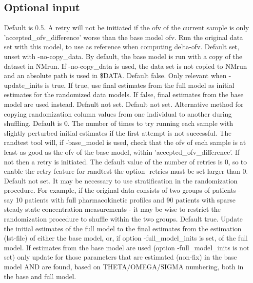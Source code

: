 \subsection{Optional input}
\begin{optionlist}
Default is 0.5. A retry will not be initiated if the ofv of the current sample is only 'accepted\_ofv\_difference' worse 
than the base model ofv.
\nextopt
{}
Run the original data set with this model, to use as reference when computing delta-ofv. 
\nextopt
{}
Default set, unset with -no-copy\_data. By default, the base model is run with a copy of the dataset in NMrun. If -no-copy\_data is used, the data set is not copied to NMrun and an absolute path is used in \$DATA. 
\nextopt
{}
Default false. Only relevant when -update\_inits is true. If true, use final estimates from the full model as initial estimates for the randomized data models. If false, final estimates from the base model are used instead.
\nextopt
{}
Default not set. Default not set. Alternative method for copying randomization column values from one individual to 
another during shuffling.     
\nextopt
{}
Default is 0. The number of times to try running each sample with slightly perturbed initial estimates if the first attempt is not successful. The randtest tool will, if -base\_model is used, check that the ofv of each sample is at least as good as the ofv of the base model, within 'accepted\_ofv\_difference'. If not then a retry is initiated. The default value of the number of retries is 0, so to enable the retry feature for randtest the option -retries must be set larger than 0. 
\nextopt
{}
Default not set. It may be necessary to use stratification in the randomization procedure. For example, if the original data consists of two groups of patients - say 10 patients with full pharmacokinetic profiles and 90 patients with sparse steady state concentration measurements - it may be wise to restrict the randomization procedure to shuffle within the two groups.
\nextopt
{}
Default true. Update the initial estimates of the full model to the final estimates from the estimation (lst-file) of either the base model, or, if option -full\_model\_inits is set, of the full model. If estimates from the base model are used (option -full\_model\_inits is not set) only update for those parameters that are estimated (non-fix) in the base model AND are found, based on THETA/OMEGA/SIGMA numbering, both in the base and full model.
\nextopt
\end{optionlist}

